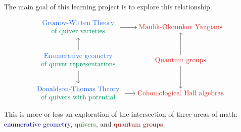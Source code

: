 The main goal of this learning project is to explore this relationship.

\[
\begin{tikzcd}[column sep=1.5em, cramped]
	\begin{array}{c} \textcolor{darkblue}{\text{Gromov-Witten Theory}} \\ \textcolor{darkgreen}{\text{of quiver varieties}} \end{array} & {\textcolor{darkred}{\text{Maulik-Okounkov Yangians}}} \\
	\begin{array}{c} \textcolor{darkblue}{\text{Enumerative geometry}} \\ \textcolor{darkgreen}{\text{of quiver representations}} \end{array} & {\textcolor{darkred}{\text{Quantum groups}}} \\
	\begin{array}{c} \textcolor{darkblue}{\text{Donaldson-Thomas Theory}} \\ \textcolor{darkgreen}{\text{of quivers with potential}} \end{array} & {\textcolor{darkred}{\text{Cohomological Hall algebras}}}
	\arrow[from=1-1, to=1-2]
	\arrow[from=2-1, to=1-1]
	\arrow[from=2-1, to=3-1]
	\arrow[from=2-2, to=1-2]
	\arrow[from=2-2, to=3-2]
	\arrow[from=3-1, to=3-2]
\end{tikzcd}
\]

This is more or less an exploration of the intersection of three areas of math: \textcolor{darkblue}{enumerative geometry}, \textcolor{darkgreen}{quivers}, and \textcolor{darkred}{quantum groups}.